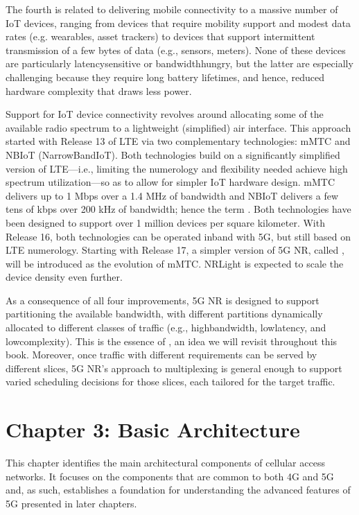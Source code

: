 \documentclass[a4paper,11pt,english]{sphinxmanual}
\begin{document}
\sphinxAtStartPar
The fourth is related to delivering mobile connectivity to a massive
number of IoT devices, ranging from devices that require mobility
support and modest data rates (e.g. wearables, asset trackers) to
devices that support intermittent transmission of a few bytes of data
(e.g., sensors, meters). None of these devices are particularly
latency\sphinxhyphen{}sensitive or bandwidth\sphinxhyphen{}hungry, but the latter are especially
challenging because they require long battery lifetimes, and hence,
reduced hardware complexity that draws less power.

\sphinxAtStartPar
Support for IoT device connectivity revolves around allocating some of
the available radio spectrum to a light\sphinxhyphen{}weight (simplified) air
interface.  This approach started with Release 13 of LTE via two
complementary technologies: mMTC and NB\sphinxhyphen{}IoT (NarrowBand\sphinxhyphen{}IoT).  Both
technologies build on a significantly simplified version of LTE—i.e.,
limiting the numerology and flexibility needed achieve high spectrum
utilization—so as to allow for simpler IoT hardware design. mMTC
delivers up to 1 Mbps over a 1.4 MHz of bandwidth and NB\sphinxhyphen{}IoT delivers a
few tens of kbps over 200 kHz of bandwidth; hence the term
.  Both technologies have been designed to support over 1
million devices per square kilometer. With Release 16, both
technologies can be operated in\sphinxhyphen{}band with 5G, but still based on LTE
numerology. Starting with Release 17, a simpler version of 5G NR,
called , will be introduced as the evolution of mMTC.
NR\sphinxhyphen{}Light is expected to scale the device density even further.

\sphinxAtStartPar
As a consequence of all four improvements, 5G NR is designed to
support partitioning the available bandwidth, with different
partitions dynamically allocated to different classes of traffic
(e.g., high\sphinxhyphen{}bandwidth, low\sphinxhyphen{}latency, and low\sphinxhyphen{}complexity). This is the
essence of , an idea we will revisit throughout this book.
Moreover, once traffic with different requirements can be served by
different slices, 5G NR’s approach to multiplexing is general enough
to support varied scheduling decisions for those slices, each tailored
for the target traffic.


\chapter{Chapter 3:  Basic Architecture}
\label{\detokenize{arch:chapter-3-basic-architecture}}\label{\detokenize{arch::doc}}
\sphinxAtStartPar
This chapter identifies the main architectural components of cellular
access networks. It focuses on the components that are common to both 4G
and 5G and, as such, establishes a foundation for understanding the
advanced features of 5G presented in later chapters.
\end{document}
